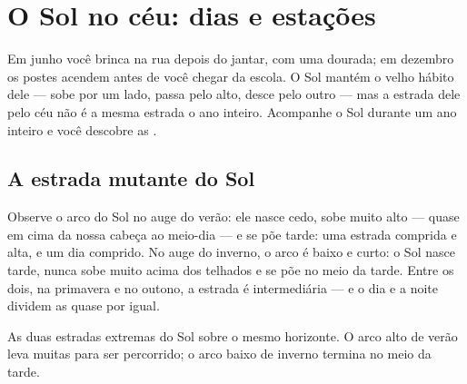 \chapter{O Sol no céu: dias e estações}\label{ch:g3:sun-days-seasons}

Em junho você brinca na rua depois do jantar, com uma  dourada; em
dezembro os postes acendem antes de você chegar da escola. O Sol
mantém o velho hábito dele --- sobe por um lado, passa pelo alto,
desce pelo outro --- mas a estrada dele pelo céu não é a mesma
estrada o ano inteiro. Acompanhe o Sol durante um ano inteiro e você
descobre as .

\section{A estrada mutante do Sol}

\begin{example}\label{ex:g3:sun-days-seasons:roads}
Observe o arco do Sol no auge do verão: ele nasce cedo, sobe muito
alto --- quase em cima da nossa cabeça ao meio-dia --- e se põe
tarde: uma estrada comprida e alta, e um dia comprido. No auge do
inverno, o arco é baixo e curto: o Sol nasce tarde, nunca sobe muito
acima dos telhados e se põe no meio da tarde. Entre os dois, na
primavera e no outono, a estrada é intermediária --- e o dia e a
noite dividem as  quase por igual.
\end{example}

\begin{omfigure}

{\small As duas estradas extremas do Sol sobre o mesmo horizonte. O
arco alto de verão leva muitas  para ser percorrido; o arco
baixo de inverno termina no meio da tarde.}
\end{omfigure}

